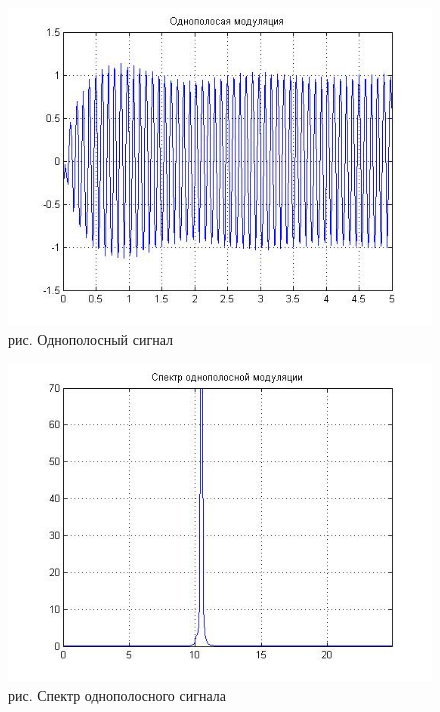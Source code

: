 \documentclass[10pt,a4paper]{report}
\begin{document}
\begin{figure}
\begin{center}
\includegraphics[angle=0, scale = 0.6]{7_7.jpg}\newline
рис. Однополосный сигнал\newline
\end{center}
\end{figure}
\begin{figure}
\begin{center}
\includegraphics[angle=0, scale = 0.6]{7_8.jpg}\newline
рис. Спектр однополосного сигнала\newline
\end{center}
\end{figure}
\end{document}
